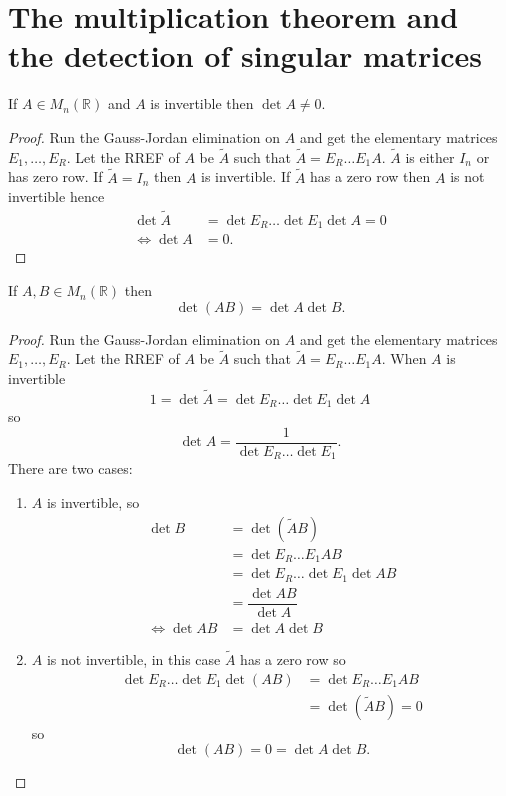 \section{The multiplication theorem and the detection of singular matrices}

\begin{theorem}
    If $A\in M_n(\mathbb R)$ and $A$ is invertible then $\det{A}\neq 0$.
\end{theorem}

\begin{proof}
    Run the Gauss-Jordan elimination on $A$ and get the elementary matrices $E_1,\ldots,E_R$. Let the RREF of $A$ be $\tilde A$ such that $\tilde A=E_R\ldots E_1A$. $\tilde A$ is either $I_n$ or has zero row. If $\tilde A=I_n$ then $A$ is invertible. If $\tilde A$ has a zero row then $A$ is not invertible hence
    \begin{align*}
        \det{\tilde A}&=\det{E_R}\ldots\det{E_1}\det{A}=0\\
        \iff \det{A}&=0.
    \end{align*}
\end{proof}

\begin{theorem}
    If $A,B\in M_n(\mathbb R)$ then \[\det{(AB)}=\det{A}\det{B}.\]
\end{theorem}

\begin{proof}
    Run the Gauss-Jordan elimination on $A$ and get the elementary matrices $E_1,\ldots,E_R$. Let the RREF of $A$ be $\tilde A$ such that $\tilde A=E_R\ldots E_1A$. When $A$ is invertible \[1=\det{\tilde A}=\det{E_R}\ldots\det{E_1}\det{A}\] so \[\det{A}=\dfrac1{\det{E_R}\ldots\det{E_1}}.\] There are two cases:
    \begin{enumerate}
        \item $A$ is invertible, so
        \begin{align*}
            \det{B}&=\det{(\tilde AB)}\\
            &=\det{E_R\ldots E_1AB}\\
            &=\det{E_R}\ldots\det{E_1}\det{AB}\\
            &=\dfrac{\det{AB}}{\det{A}}\\
            \iff\det{AB}&=\det{A}\det{B}
        \end{align*}
        
        \item $A$ is not invertible, in this case $\tilde A$ has a zero row so 
        \begin{align*}
            \det{E_R}\ldots\det{E_1}\det{(AB)}&=\det{E_R\ldots E_1AB}\\
            &=\det{(\tilde AB)}=0
        \end{align*}
        so \[\det{(AB)}=0=\det{A}\det{B}.\]
    \end{enumerate}
\end{proof}

